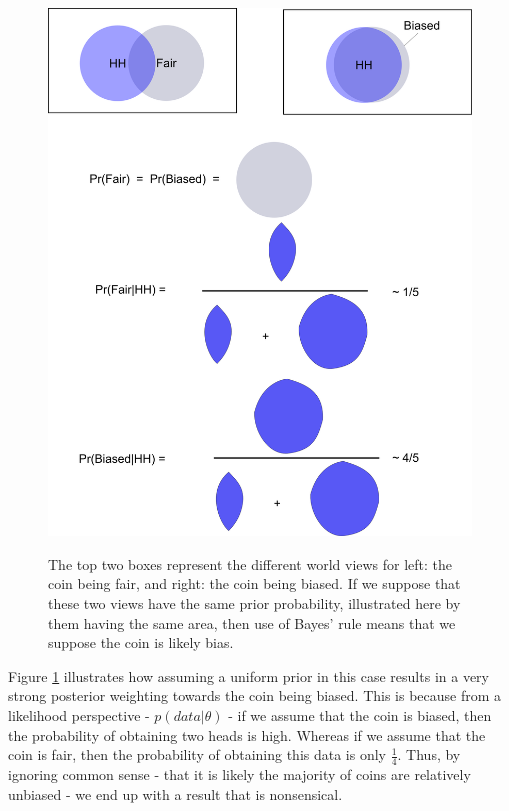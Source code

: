 \documentclass[11pt,fullpage]{book}
\begin{document}
\begin{figure}
\centering
\scalebox{0.1} 
{\includegraphics{Prior_priorJustificationCoin.png}}
\caption{The top two boxes represent the different world views for left: the coin being fair, and right: the coin being biased. If we suppose that these two views have the same prior probability, illustrated here by them having the same area, then use of Bayes' rule means that we suppose the coin is likely bias.}\label{fig:Prior_priorJustificationCoin}
\end{figure}

Figure \ref{fig:Prior_priorJustificationCoin} illustrates how assuming a uniform prior in this case results in a very strong posterior weighting towards the coin being biased. This is because from a likelihood perspective - $p(data|\theta)$ - if we assume that the coin is biased, then the probability of obtaining two heads is high. Whereas if we assume that the coin is fair, then the probability of obtaining this data is only $\frac{1}{4}$. Thus, by ignoring common sense - that it is likely the majority of coins are relatively unbiased - we end up with a result that is nonsensical. 
\end{document}
